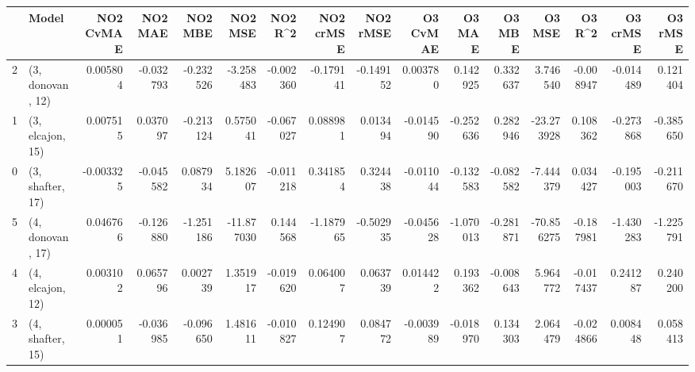 \begin{tabular}{llrrrrrrrrrrrrrr}
\toprule
{} &             Model &  NO2 CvMAE &   NO2 MAE &   NO2 MBE &    NO2 MSE &   NO2 R\textasciicircum2 &  NO2 crMSE &  NO2 rMSE &  O3 CvMAE &    O3 MAE &    O3 MBE &     O3 MSE &    O3 R\textasciicircum2 &  O3 crMSE &   O3 rMSE \\
\midrule
2 &  (3, donovan, 12) &   0.005804 & -0.032793 & -0.232526 &  -3.258483 & -0.002360 &  -0.179141 & -0.149152 &  0.003780 &  0.142925 &  0.332637 &   3.746540 & -0.008947 & -0.014489 &  0.121404 \\
1 &  (3, elcajon, 15) &   0.007515 &  0.037097 & -0.213124 &   0.575041 & -0.067027 &   0.088981 &  0.013494 & -0.014590 & -0.252636 &  0.282946 & -23.273928 &  0.108362 & -0.273868 & -0.385650 \\
0 &  (3, shafter, 17) &  -0.003325 & -0.045582 &  0.087934 &   5.182607 & -0.011218 &   0.341854 &  0.324438 & -0.011044 & -0.132583 & -0.082582 &  -7.444379 &  0.034427 & -0.195003 & -0.211670 \\
5 &  (4, donovan, 17) &   0.046766 & -0.126880 & -1.251186 & -11.877030 &  0.144568 &  -1.187965 & -0.502935 & -0.045628 & -1.070013 & -0.281871 & -70.856275 & -0.187981 & -1.430283 & -1.225791 \\
4 &  (4, elcajon, 12) &   0.003102 &  0.065796 &  0.002739 &   1.351917 & -0.019620 &   0.064007 &  0.063739 &  0.014422 &  0.193362 & -0.008643 &   5.964772 & -0.017437 &  0.241287 &  0.240200 \\
3 &  (4, shafter, 15) &   0.000051 & -0.036985 & -0.096650 &   1.481611 & -0.010827 &   0.124907 &  0.084772 & -0.003989 & -0.018970 &  0.134303 &   2.064479 & -0.024866 &  0.008448 &  0.058413 \\
\bottomrule
\end{tabular}
